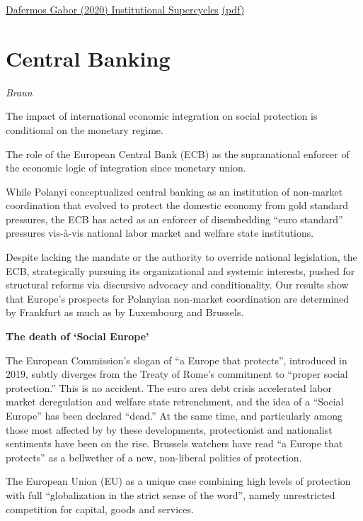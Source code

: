 \documentclass[
]{book}
\begin{document}
\href{https://www.researchgate.net/publication/343472909_Institutional_supercycles_an_evolutionary_macro-finance_approach}{Dafermos Gabor (2020) Institutional Supercycles}
\href{pdf/Dafermos_Gabor_2021_Institutional_Supercycles.pdf}{(pdf)}

\hypertarget{central-banking}{%
\section{Central Banking}\label{central-banking}}

\emph{Braun}

The impact of international economic integration on social protection is conditional on
the monetary regime.

The role of the European Central Bank (ECB) as the supranational enforcer of the
economic logic of integration since monetary union.

While Polanyi conceptualized central banking as an institution of
non-market coordination that evolved to protect the
domestic economy from gold standard pressures,
the ECB has acted as an enforcer of disembedding ``euro standard'' pressures
vis-à-vis national labor market and welfare state institutions.

Despite lacking the mandate or the authority to override national legislation,
the ECB, strategically pursuing its organizational and systemic interests, pushed
for structural reforms via discursive advocacy and conditionality.
Our results show that
Europe's prospects for Polanyian non-market coordination are determined by Frankfurt
as much as by Luxembourg and Brussels.

\textbf{The death of `Social Europe'}

The European Commission's slogan of ``a Europe that protects'', introduced in 2019,
subtly diverges from the Treaty of Rome's commitment to ``proper social protection.''
This is no accident.
The euro area debt crisis accelerated labor market deregulation and
welfare state retrenchment, and the idea of a ``Social Europe'' has been declared ``dead.''
At the same time, and particularly among those most affected by by these developments,
protectionist and nationalist sentiments have been on the rise.
Brussels watchers have read ``a Europe that protects'' as a bellwether
of a new, non-liberal politics of protection.

The European Union (EU) as a unique case combining
high levels of protection with full
``globalization in the strict sense of the word'',
namely unrestricted competition for capital, goods and services.
\end{document}
